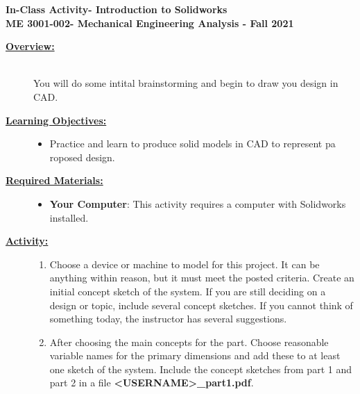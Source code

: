 \documentclass[12pt]{article}
\newcommand{\COURNAME}{ME 3001-002}
\newcommand{\CURRTERM}{Fall 2021} %
\newcommand{\ANUM}{2} %
\newcommand{\activitytitle}{Introduction to Solidworks} %
\begin{document}
\thispagestyle{plain}

\begin{center}
   {\bf \Large In-Class Activity\hspc\ANUM\hspc - \activitytitle}\vspace{3mm}\\
   {\bf \large \COURNAME - Mechanical Engineering Analysis - \CURRTERM} \vspace{5mm}\\
\end{center}

\begin{description}

\item[\textbf{\underline{Overview:}}] \hfill \vspace{3mm}\\
You will do some intital brainstorming and begin to draw you design in CAD.

\item[\textbf{\underline{Learning Objectives:}}] \hfill \vspace{0mm}

\begin{itemize}
	\item Practice and learn to produce solid models in CAD to represent pa roposed design. 
\end{itemize}

\item[\textbf{\underline{Required Materials:}}] \hfill \vspace{0mm}

\begin{itemize}
	\item {\bf Your Computer}: This activity requires a computer with Solidworks installed.
\end{itemize}

\item[\textbf{\underline{Activity:}}] \hfill \vspace{0mm}

\begin{enumerate}
	

	\item Choose a device or machine to model for this project. It can be anything within reason, but it must meet the posted criteria. Create an initial concept sketch of the system. If you are still deciding on a design or topic, include several concept sketches. If you cannot think of something today, the instructor has several suggestions.
	
	\item After choosing the main concepts for the part. Choose reasonable variable names for the primary dimensions and add these to at least one sketch of the system. Include the concept sketches from part 1 and part 2 in a file {\bf \BL<USERNAME>\BK\_part1.pdf}. 
	

\end{enumerate}
\end{description}
\end{document}
